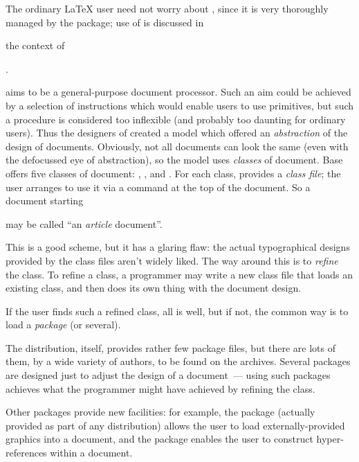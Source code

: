 The ordinary \LaTeX{} user need not worry about , since
it is very thoroughly managed by the  package; use of
 is discussed in
\begin{wideversion}
  the context of
\end{wideversion}
.


\latex{} aims to be a general-purpose document processor.  Such an aim
could be achieved by a selection of instructions which would enable
users to use \tex{} primitives, but such a procedure is considered too
inflexible (and probably too daunting for ordinary users).  Thus the
designers of \latex{} created a model which offered an
\emph{abstraction} of the design of documents.  Obviously, not all
documents can look the same (even with the defocussed eye of
abstraction), so the model uses \emph{classes} of document.  Base
\latex{} offers five classes of document: ,
,  and .
For each class, \latex{} provides a \emph{class file}; the user
arranges to use it via a  command at the top of the
document.  So a document starting
\begin{quote}
\end{quote}
may be called ``an \emph{article} document''.

This is a good scheme, but it has a glaring flaw: the actual
typographical designs provided by the \latex{} class files aren't
widely liked.  The way around this is to \emph{refine} the class.  To
refine a class, a programmer may write a new class file that loads an
existing class, and then does its own thing with the document design.

If the user finds such a refined class, all is well, but if not, the
common way is to load a \emph{package} (or several).

The \latex{} distribution, itself, provides rather few package files,
but there are lots of them, by a wide variety of authors, to be found
on the archives.  Several packages are designed just to adjust the
design of a document~--- using such packages achieves what the
programmer might have achieved by refining the class.

Other packages provide new facilities: for example, the
 package (actually provided as part of any \latex{}
distribution) allows the user to load externally-provided graphics
into a document, and the  package enables the user
to construct hyper-references within a document.

